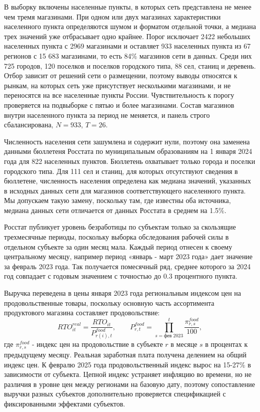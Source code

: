 \documentclass[12pt, a4paper]{article}
\begin{document}
В выборку включены населенные пункты, в которых сеть представлена не менее чем тремя магазинами.
При одном или двух магазинах характеристики населенного пункта определяются шумом и форматом
отдельной точки, а медиана трех значений уже отбрасывает одно крайнее. Порог исключает 2422
небольших населенных пункта с 2969 магазинами и оставляет 933 населенных пункта из 67 регионов
с 15 683 магазинами, то есть 84\% магазинов сети в данных. Среди них 725 городов, 120 поселков и
поселков городского типа, 88 сел, станиц и деревень. Отбор зависит от решений сети о
размещении, поэтому выводы относятся к рынкам, на которых сеть уже присутствует несколькими
магазинами, и не переносятся на все населенные пункты России. Чувствительность к порогу
проверяется на подвыборке с пятью и более магазинами. Состав магазинов внутри населенного пункта
за период не меняется, и панель строго сбалансирована, $N = 933$, $T = 26$.

Численность населения сети зашумлена и содержит нули, поэтому она заменена данными бюллетеня
Росстата по муниципальным образованиям на 1 января 2024 года для 822 населенных пунктов. Бюллетень
охватывает только города и поселки городского типа. Для 111 сел и станиц, для которых отсутствуют
сведения в бюллетене, численность населения определена как медиана значений, указанных в исходных
данных сети для магазинов соответствующего населенного пункта. Мы допускаем такую замену, поскольку
там, где известны оба источника, медиана данных сети отличается от данных Росстата в среднем на
1.5\%.

Росстат публикует уровень безработицы по субъектам только за скользящие трехмесячные периоды,
поскольку выборка обследования рабочей силы в отдельном субъекте за один месяц мала. Каждый период
отнесен к своему центральному месяцу, например период «январь - март 2023 года» дает значение за
февраль 2023 года. Так получается помесячный ряд, среднее которого за 2024 год совпадает с
годовым значением с точностью до 0.3 процентного пункта.

Выручка переведена в цены января 2023 года региональным индексом цен на продовольственные товары,
поскольку основную часть ассортимента продуктового магазина составляет продовольствие:
\[
RTO^{real}_{it} = \frac{RTO_{it}}{P^{food}_{r(i),t}}, \qquad
P^{food}_{r,t} = \prod_{s = \text{фев 2023}}^{t} \frac{\pi^{food}_{r,s}}{100},
\]
где $\pi^{food}_{r,s}$ - индекс цен на продовольствие в субъекте $r$ в месяце $s$ в процентах к
предыдущему месяцу. Реальная заработная плата получена делением на общий индекс цен. К февралю
2025 года продовольственный индекс вырос на 15-27\% в зависимости от субъекта. Цепной индекс
устраняет инфляцию во времени, но не различия в уровне цен между регионами на базовую дату,
поэтому сопоставление выручки разных субъектов дополнительно проверяется спецификацией с
фиксированными эффектами субъектов.
\end{document}
